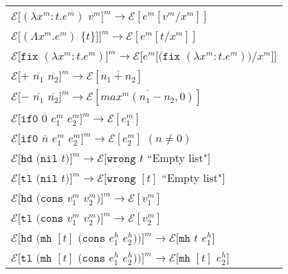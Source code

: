 \begin{figure}[p]
\centering
\begin{tabular}{l}

$\mathscr{E}[(\lambda x^m:t.e^m)$ $v^m]^m\rightarrow\mathscr{E}[e^m[v^m/x^m]]$ \\

$\mathscr{E}[(\Lambda x^m.e^m)$ $\lbrace t\rbrace]]^m\rightarrow\mathscr{E}[e^m[t/x^m]]$ \\

$\mathscr{E}[\mathtt{fix}$ $(\lambda x^m:t.e^m)]^m\rightarrow\mathscr{E}[e^m[(\mathtt{fix}$ $(\lambda x^m:t.e^m))/x^m]]$ \\

$\mathscr{E}[+$ $\overline{n_{1}}$ $\overline{n_{2}}]^m\rightarrow\mathscr{E}[\overline{n_{1}+n_{2}}]$ \\

$\mathscr{E}[-$ $\overline{n_{1}}$ $\overline{n_{2}}]^m\rightarrow\mathscr{E}[\overline{max^m(n_{1}-n_{2},0)}]$ \\

$\mathscr{E}[\mathtt{if0}$ $\overline{0}$ $e^m_1$ $e^m_2]^m\rightarrow\mathscr{E}[e^m_1]$ \\

$\mathscr{E}[\mathtt{if0}$ $\overline{n}$ $e^m_1$ $e^m_2]^m\rightarrow\mathscr{E}[e^m_2]$ $(n\neq0)$ \\

$\mathscr{E}[\mathtt{hd}$ $(\mathtt{nil}$ $t)]^m\rightarrow\mathscr{E}[\mathtt{wrong}$ $t$ ``Empty list"$]$ \\

$\mathscr{E}[\mathtt{tl}$ $(\mathtt{nil}$ $t)]^m\rightarrow\mathscr{E}[\mathtt{wrong}$ $[t]$ ``Empty list"$]$ \\

$\mathscr{E}[\mathtt{hd}$ $(\mathtt{cons}$ $v^m_1$ $v^m_2)]^m\rightarrow\mathscr{E}[v^m_1]$ \\

$\mathscr{E}[\mathtt{tl}$ $(\mathtt{cons}$ $v^m_1$ $v^m_2)]^m\rightarrow\mathscr{E}[v^m_2]$ \\

$\mathscr{E}[\mathtt{hd}$ $(\mathtt{mh}$ $[t]$ $(\mathtt{cons}$ $e^h_1$ $e^h_2))]^m\rightarrow\mathscr{E}[\mathtt{mh}$ $t$ $e^h_1]$ \\

$\mathscr{E}[\mathtt{tl}$ $(\mathtt{mh}$ $[t]$ $(\mathtt{cons}$ $e^h_1$ $e^h_2))]^m\rightarrow\mathscr{E}[\mathtt{mh}$ $[t]$ $e^h_2]$ \\


\end{tabular}
\end{figure}
